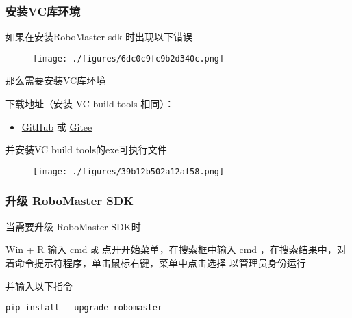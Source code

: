 \subsubsection{安装VC库环境}
如果在安装RoboMaster sdk 时出现以下错误\begin{figure}[ht]
\centering
\texttt{[image: ./figures/6dc0c9fc9b2d340c.png]}
\caption{} \label{fig_PyRM1_2}
\end{figure}
那么需要安装VC库环境

下载地址（安装 VC build tools 相同）：\begin{itemize}
\item \href{https://github.com/dji-sdk/robomaster-sdk}{GitHub} 或 \href{https://gitee.com/xitinglin/RoboMaster-SDK}{Gitee}
\end{itemize}

并安装VC build tools的exe可执行文件

\begin{figure}[ht]
\centering
\texttt{[image: ./figures/39b12b502a12af58.png]}
\caption{} \label{fig_PyRM1_3}
\end{figure}

\subsubsection{升级 RoboMaster SDK}
当需要升级 RoboMaster SDK时

Win + R 输入 cmd 
\verb|或|
点开开始菜单，在搜索框中输入 cmd ，在搜索结果中，对着命令提示符程序，单击鼠标右键，菜单中点击选择 以管理员身份运行 

并输入以下指令

\begin{lstlisting}[language=pythonC]
pip install --upgrade robomaster
\end{lstlisting}

